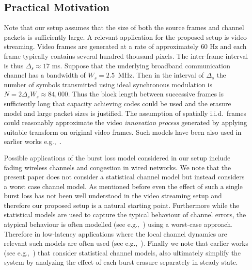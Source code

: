 \documentclass[journal, twocolumn, 10pt]{IEEEtran}
\newcommand{\rvs}{{\mathssf{s}}}    %
\begin{document}
\subsection{Practical Motivation}

Note that our setup assumes that the size of both the source frames and  channel packets is sufficiently large. A  relevant application for the proposed setup is video streaming. Video frames are generated at a  rate of approximately 60 Hz and each frame typically contains several hundred thousand pixels.  The inter-frame interval is thus $\Delta_s \approx 17 $ ms. Suppose that the underlying broadband communication channel has a bandwidth of $W_s = 2.5$~MHz. Then in the interval of $\Delta_s$ the number of symbols transmitted using ideal synchronous modulation is $N=2\Delta_s W_s \approx 84,000$. Thus the block length between successive frames is sufficiently long that capacity achieving codes could be used and the erasure model and large packet sizes is justified. 
The assumption of spatially i.i.d.\ frames could reasonably approximate the video \emph{innovation process} generated by applying suitable transform on original video frames. 
Such models have been also used in earlier works e.g.,~\cite{berger,songChen12,Huang:08,ishwar,Wu}.   

Possible applications of the burst loss model considered in our setup  include fading wireless channels and congestion in wired networks. We note that the present paper does not consider a statistical channel model but  instead considers a worst case channel model.  As mentioned before even the effect of such a single burst loss has not been well understood in the video streaming setup and therefore our proposed setup is a natural starting point. Furthermore while the statistical models are used to capture the typical behaviour of channel errors, the atypical behaviour is often modelled (see e.g.,~\cite[Sec.~6.10]{gallager}) using a worst-case approach. Therefore in low-latency applications where the local channel dynamics are relevant such models are often used (see e.g.,~\cite{martinianThesis, badrinfo:13,tekin,leong}). Finally we note that earlier works (see e.g.,~\cite{Huang:08}) that consider statistical channel models, also ultimately simplify the system by analyzing the effect of each burst erasure separately in steady state.  
\end{document}
